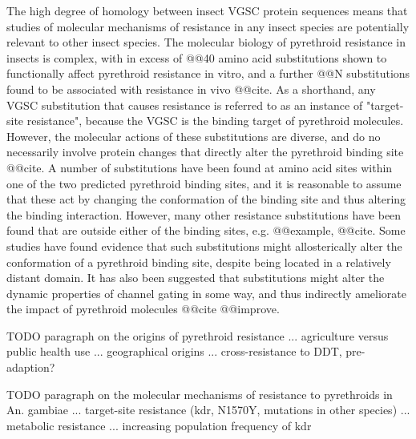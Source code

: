 \documentclass[a4paper,11pt,abstracton,hidelinks]{scrartcl}
\begin{document}
%
The high degree of homology between insect VGSC protein sequences means that studies of molecular mechanisms of resistance in any insect species are potentially relevant to other insect species.
%
The molecular biology of pyrethroid resistance in insects is complex, with in excess of @@40 amino acid substitutions shown to functionally affect pyrethroid resistance in vitro, and a further @@N substitutions found to be associated with resistance in vivo @@cite.
%
As a shorthand, any VGSC substitution that causes resistance is referred to as an instance of "target-site resistance", because the VGSC is the binding target of pyrethroid molecules.
%
However, the molecular actions of these substitutions are diverse, and do no necessarily involve protein changes that directly alter the pyrethroid binding site @@cite.
%
A number of substitutions have been found at amino acid sites within one of the two predicted pyrethroid binding sites, and it is reasonable to assume that these act by changing the conformation of the binding site and thus altering the binding interaction.
%
However, many other resistance substitutions have been found that are outside either of the binding sites, e.g. @@example, @@cite.
%
Some studies have found evidence that such substitutions might allosterically alter the conformation of a pyrethroid binding site, despite being located in a relatively distant domain.
%
It has also been suggested that substitutions might alter the dynamic properties of channel gating in some way, and thus indirectly ameliorate the impact of pyrethroid molecules @@cite @@improve.

TODO paragraph on the origins of pyrethroid resistance ... agriculture versus public health use ... geographical origins ... cross-resistance to DDT, pre-adaption?


TODO paragraph on the molecular mechanisms of resistance to pyrethroids in An.  gambiae ... target-site resistance (kdr, N1570Y, mutations in other species) ... metabolic resistance ... increasing population frequency of kdr
\end{document}
